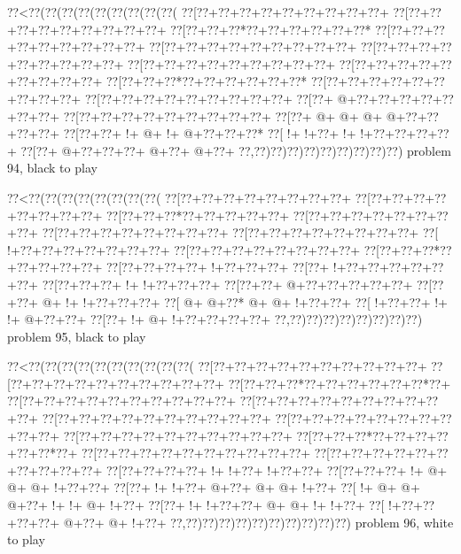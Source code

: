 \vbox{\vbox{\goo
\0??<\0??(\0??(\0??(\0??(\0??(\0??(\0??(\0??(\0??(
\0??[\0??+\0??+\0??+\0??+\0??+\0??+\0??+\0??+\0??+
\0??[\0??+\0??+\0??+\0??+\0??+\0??+\0??+\0??+\0??+
\0??[\0??+\0??+\0??*\0??+\0??+\0??+\0??+\0??+\0??*
\0??[\0??+\0??+\0??+\0??+\0??+\0??+\0??+\0??+\0??+
\0??[\0??+\0??+\0??+\0??+\0??+\0??+\0??+\0??+\0??+
\0??[\0??+\0??+\0??+\0??+\0??+\0??+\0??+\0??+\0??+
\0??[\0??+\0??+\0??+\0??+\0??+\0??+\0??+\0??+\0??+
\0??[\0??+\0??+\0??+\0??+\0??+\0??+\0??+\0??+\0??+
\0??[\0??+\0??+\0??*\0??+\0??+\0??+\0??+\0??+\0??*
\0??[\0??+\0??+\0??+\0??+\0??+\0??+\0??+\0??+\0??+
\0??[\0??+\0??+\0??+\0??+\0??+\0??+\0??+\0??+\0??+
\0??[\0??+\- @+\0??+\0??+\0??+\0??+\0??+\0??+\0??+
\0??[\0??+\0??+\0??+\0??+\0??+\0??+\0??+\0??+\0??+
\0??[\0??+\- @+\- @+\- @+\- @+\0??+\0??+\0??+\0??+
\0??[\0??+\0??+\- !+\- @+\- !+\- @+\0??+\0??+\0??*
\0??[\- !+\- !+\0??+\- !+\- !+\0??+\0??+\0??+\0??+
\0??[\0??+\- @+\0??+\0??+\0??+\- @+\0??+\- @+\0??+
\0??,\0??)\0??)\0??)\0??)\0??)\0??)\0??)\0??)\0??)
}
\hfil problem 94, black to play\hfil\break
}

\vbox{\vbox{\goo
\0??<\0??(\0??(\0??(\0??(\0??(\0??(\0??(\0??(
\0??[\0??+\0??+\0??+\0??+\0??+\0??+\0??+\0??+
\0??[\0??+\0??+\0??+\0??+\0??+\0??+\0??+\0??+
\0??[\0??+\0??+\0??*\0??+\0??+\0??+\0??+\0??+
\0??[\0??+\0??+\0??+\0??+\0??+\0??+\0??+\0??+
\0??[\0??+\0??+\0??+\0??+\0??+\0??+\0??+\0??+
\0??[\0??+\0??+\0??+\0??+\0??+\0??+\0??+\0??+
\0??[\- !+\0??+\0??+\0??+\0??+\0??+\0??+\0??+
\0??[\0??+\0??+\0??+\0??+\0??+\0??+\0??+\0??+
\0??[\0??+\0??+\0??*\0??+\0??+\0??+\0??+\0??+
\0??[\0??+\0??+\0??+\0??+\- !+\0??+\0??+\0??+
\0??[\0??+\- !+\0??+\0??+\0??+\0??+\0??+\0??+
\0??[\0??+\0??+\0??+\- !+\- !+\0??+\0??+\0??+
\0??[\0??+\0??+\- @+\0??+\0??+\0??+\0??+\0??+
\0??[\0??+\0??+\- @+\- !+\- !+\0??+\0??+\0??+
\0??[\- @+\- @+\0??*\- @+\- @+\- !+\0??+\0??+
\0??[\- !+\0??+\0??+\- !+\- !+\- @+\0??+\0??+
\0??[\0??+\- !+\- @+\- !+\0??+\0??+\0??+\0??+
\0??,\0??)\0??)\0??)\0??)\0??)\0??)\0??)\0??)
}
\hfil problem 95, black to play\hfil\break
}

\vbox{\vbox{\goo
\0??<\0??(\0??(\0??(\0??(\0??(\0??(\0??(\0??(\0??(\0??(
\0??[\0??+\0??+\0??+\0??+\0??+\0??+\0??+\0??+\0??+\0??+
\0??[\0??+\0??+\0??+\0??+\0??+\0??+\0??+\0??+\0??+\0??+
\0??[\0??+\0??+\0??*\0??+\0??+\0??+\0??+\0??+\0??*\0??+
\0??[\0??+\0??+\0??+\0??+\0??+\0??+\0??+\0??+\0??+\0??+
\0??[\0??+\0??+\0??+\0??+\0??+\0??+\0??+\0??+\0??+\0??+
\0??[\0??+\0??+\0??+\0??+\0??+\0??+\0??+\0??+\0??+\0??+
\0??[\0??+\0??+\0??+\0??+\0??+\0??+\0??+\0??+\0??+\0??+
\0??[\0??+\0??+\0??+\0??+\0??+\0??+\0??+\0??+\0??+\0??+
\0??[\0??+\0??+\0??*\0??+\0??+\0??+\0??+\0??+\0??*\0??+
\0??[\0??+\0??+\0??+\0??+\0??+\0??+\0??+\0??+\0??+\0??+
\0??[\0??+\0??+\0??+\0??+\0??+\0??+\0??+\0??+\0??+\0??+
\0??[\0??+\0??+\0??+\0??+\- !+\- !+\0??+\- !+\0??+\0??+
\0??[\0??+\0??+\0??+\- !+\- @+\- @+\- @+\- !+\0??+\0??+
\0??[\0??+\- !+\- !+\0??+\- @+\0??+\- @+\- @+\- !+\0??+
\0??[\- !+\- @+\- @+\- @+\0??+\- !+\- !+\- @+\- !+\0??+
\0??[\0??+\- !+\- !+\0??+\0??+\- @+\- @+\- !+\- !+\0??+
\0??[\- !+\0??+\0??+\0??+\0??+\- @+\0??+\- @+\- !+\0??+
\0??,\0??)\0??)\0??)\0??)\0??)\0??)\0??)\0??)\0??)\0??)
}
\hfil problem 96, white to play\hfil\break
}

